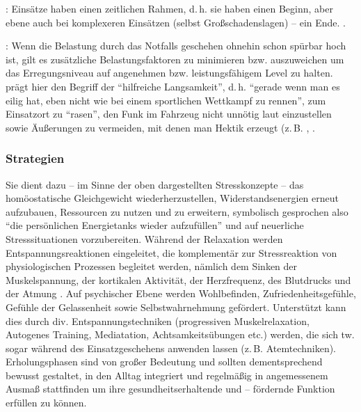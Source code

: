: Einsätze haben einen
zeitlichen Rahmen, d.\,h. sie haben einen Beginn, aber ebene
auch bei komplexeren Einsätzen (selbst Großschadenslagen) –
ein Ende.  \cite{Karutz200912}.

: Wenn die Belastung durch
das Notfalls geschehen ohnehin schon spürbar hoch ist, gilt
es zusätzliche Belastungsfaktoren zu minimieren bzw.
auszuweichen um das Erregungsniveau auf angenehmen bzw.
leistungsfähigem Level zu halten. 
\cite{Karutz200912} prägt hier den Begriff der \enquote{hilfreiche Langsamkeit}, d.\,h. \enquote{gerade wenn
man es eilig hat, eben nicht wie bei einem sportlichen
Wettkampf zu rennen}, zum Einsatzort zu \enquote{rasen}, den Funk im
Fahrzeug nicht unnötig laut einzustellen sowie Äußerungen zu
vermeiden, mit denen man Hektik erzeugt (z.\,B.
, .

\subsubsection{ Strategien}

{Sie dient dazu -- im Sinne der oben
dargestellten Stresskonzepte -- das homöostatische
Gleichgewicht wiederherzustellen, Widerstandsenergien erneut
aufzubauen, Ressourcen zu nutzen und zu erweitern,
symbolisch gesprochen also \enquote{die persönlichen Energietanks
wieder aufzufüllen} und auf neuerliche Stresssituationen
vorzubereiten. Während der Relaxation werden
Entspannungsreaktionen eingeleitet, die komplementär zur
Stressreaktion von physiologischen Prozessen begleitet
werden, nämlich dem Sinken der Muskelspannung, der
kortikalen Aktivität, der Herzfrequenz, des Blutdrucks und
der Atmung \cite{ZimbardoPsych6}. Auf
psychischer Ebene werden Wohlbefinden, Zufriedenheitsgefühle, Gefühle der
Gelassenheit sowie Selbstwahrnehmung gefördert. Unterstützt
kann dies durch div. Entspannungstechniken (progressiven
Muskelrelaxation, Autogenes Training, Mediatation,
Achtsamkeitsübungen etc.) werden, die sich tw. sogar während
des Einsatzgeschehens anwenden lassen (z.\,B.
Atemtechniken). Erholungsphasen sind von großer Bedeutung
und sollten dementsprechend bewusst gestaltet, in den Alltag
integriert und regelmäßig in angemessenem Ausmaß stattfinden
um ihre gesundheitserhaltende und -- fördernde Funktion
erfüllen zu können.}
{}
{}
{}
{}

